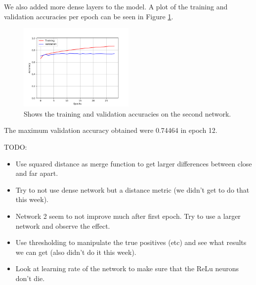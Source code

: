 We also added more dense layers to the model. A plot of the
training and validation accuracies per epoch can be seen in Figure
\ref{fig:network2_accuracies}.

\begin{figure}
    \centering
    \includegraphics[width=0.5\textwidth]{./pictures/method/network_2_accuracies.png}
    \caption{Shows the training and validation accuracies on the second
        network.}
    \label{fig:network2_accuracies}
\end{figure}

The maximum validation accuracy obtained were 0.74464 in epoch 12.


TODO:
\begin{itemize}
    \item Use squared distance as merge function to get larger differences
        between close and far apart.
    \item Try to not use dense network but a distance metric (we didn't get to
        do that this week).
    \item Network 2 seem to not improve much after first epoch. Try to use a
        larger network and observe the effect.
    \item Use thresholding to manipulate the true positives (etc) and see what
        results we can get (also didn't do it this week).
    \item Look at learning rate of the network to make sure that the ReLu
        neurons don't die.
\end{itemize}
